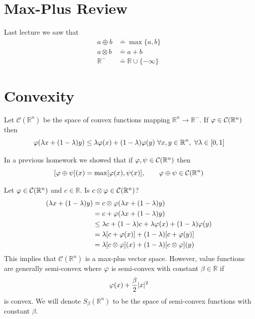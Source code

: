 \mainmatter%
\setcounter{page}{1}

\lectureseries[\course]{\course}

\date{December 3, 2009}

\setaddress%

\setcounter{lecture}{17}
\setcounter{chapter}{17}


\section{Max-Plus Review}
Last lecture we saw that
\begin{align*}
a\oplus b &\doteq \max\{a,b\} \\
a\otimes b &\doteq a+b \\
\mathbb{R}^- &\doteq \mathbb{R}\cup\{-\infty\}
\end{align*}

\section{Convexity}
Let $\mathcal{C}(\mathbb{R}^n)$ be the space of convex functions mapping $\mathbb{R}^n\to\mathbb{R}^-$.
If $\varphi\in\mathcal{C}(\mathbb{R}^n)$ then
$$\varphi(\lambda x+(1-\lambda)y) \leq \lambda\varphi(x) + (1-\lambda)\varphi(y)~\forall x,y\in\mathbb{R}^n,~\forall \lambda\in[0,1]$$

In a previous homework we showed that if $\varphi,\psi\in\mathcal{C}(\mathbb{R}^n)$ then
$$[\varphi\oplus\psi](x) = \max[\varphi(x),\psi(x)], \qquad \varphi\oplus\psi\in\mathcal{C}(\mathbb{R}^n)$$

Let $\varphi\in\mathcal{C}(\mathbb{R}^n)$ and $c\in\mathbb{R}$.
Is $c\otimes\varphi\in\mathcal{C}(\mathbb{R}^n)$?
\begin{align*}
[c\otimes\vp](\lambda x+(1-\lambda)y) &= c\otimes\vp(\lambda x+(1-\lambda)y) \\
&= c + \vp(\lambda x+(1-\lambda)y) \\
&\leq \lambda c + (1-\lambda)c + \lambda\vp(x) + (1-\lambda)\vp(y) \\
&= \lambda[c+\vp(x)] + (1-\lambda)[c+\vp(y)] \\
&= \lambda[c\otimes\vp](x) + (1-\lambda)[c\otimes\vp](y)
\end{align*}
This implies that $\mathcal{C}(\mathbb{R}^n)$ is a max-plus vector space.
However, value functions are generally semi-convex where $\varphi$ is semi-convex with constant $\beta\in\mathbb{R}$ if
$$\varphi(x) + \frac{\beta}{2}|x|^2$$
is convex.
We will denote $S_\beta(\mathbb{R}^n)$ to be the space of semi-convex functions with constant $\beta$.

